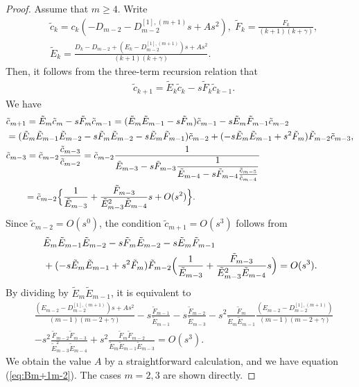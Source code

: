 \documentclass[10pt,a4paper]{amsart}
\begin{document}
\begin{proof}
Assume that $m \geq 4$.
Write
\begin{align}
& \tilde{c}_k = c_{k} (-D_{m-2} - D_{m-2}^{[1],(m+1)} s +A s^2 ) , \; \tilde{F}_k = \frac{F_k }{(k+1)(k+\gamma )} , \\
& \tilde{E}_k = \frac{D_k -D_{m-2} +  (E_k - D_{m-2}^{[1],(m+1)}) s +A s^2 }{(k+1)(k+\gamma )}  . \nonumber
\end{align}
Then, it follows from the three-term recursion relation that
\begin{align}
& \tilde{c}_{k+1} = \tilde{E}_{k} \tilde{c}_{k} - s \tilde{F}_{k} \tilde{c}_{k-1} .
\end{align}
We have
\begin{align}
& \tilde{c}_{m+1} = \tilde{E}_m \tilde{c}_{m} - s \tilde{F}_m \tilde{c}_{m-1} 
 = ( \tilde{E}_m \tilde{E}_{m-1} - s \tilde{F}_m  ) \tilde{c}_{m-1} - s \tilde{E}_m \tilde{F}_{m-1} \tilde{c}_{m-2} \\
& = ( \tilde{E}_m \tilde{E}_{m-1} \tilde{E}_{m-2} -s  \tilde{F}_m   \tilde{E}_{m-2} -s  \tilde{E}_m \tilde{F}_{m-1} ) \tilde{c}_{m-2} + ( - s \tilde{E}_m \tilde{E}_{m-1} + s^2  \tilde{F}_m  ) \tilde{F}_{m-2} \tilde{c}_{m-3} , \nonumber \\
& \tilde{c}_{m-3} = \tilde{c}_{m-2} \frac{\tilde{c}_{m-3}}{\tilde{c}_{m-2}}  = \tilde{c}_{m-2} \frac{1}{\displaystyle \tilde{E}_{m-3}  -s  \tilde{F}_{m-3} \frac{1}{\tilde{E}_{m-4} -s  \tilde{F}_{m-4} \frac{\tilde{c}_{m-5}}{\tilde{c}_{m-4}} } } \nonumber \\
& \qquad = \tilde{c}_{m-2} \Bigl\{ \frac{1}{\tilde{E}_{m-3}} + \frac{\tilde{F}_{m-3}}{\tilde{E}_{m-3}^2\tilde{E}_{m-4}} s +O(s^2)  \Bigr\} . \nonumber 
\end{align}
Since $ \tilde{c}_{m-2} = O(s^0)$, the condition $\tilde{c}_{m+1} = O(s^3)  $ follows from
\begin{align}
& \tilde{E}_m \tilde{E}_{m-1} \tilde{E}_{m-2} -s  \tilde{F}_m   \tilde{E}_{m-2} -s  \tilde{E}_m \tilde{F}_{m-1} \\
&  + ( - s \tilde{E}_m \tilde{E}_{m-1} + s^2  \tilde{F}_m  ) \tilde{F}_{m-2} \Bigl( \frac{1}{\tilde{E}_{m-3}} + \frac{\tilde{F}_{m-3}}{\tilde{E}_{m-3}^2\tilde{E}_{m-4}} s  \Bigr) = O(s^3) . \nonumber
\end{align}
By dividing by $\tilde{E}_m \tilde{E}_{m-1} $, it is equivalent to
\begin{align}
& \frac{(E_{m-2} - D_{m-2}^{[1],(m+1)}) s +A s^2}{(m-1)(m-2+\gamma )} -s \frac{\tilde{F}_{m-1}}{ \tilde{E}_{m-1}} - s \frac{\tilde{F}_{m-2} }{\tilde{E}_{m-3}}  -s^2  \frac{\tilde{F}_m  }{ \tilde{E}_m \tilde{E}_{m-1}}  \frac{ (E_{m-2} - D_{m-2}^{[1],(m+1)}) }{(m-1)(m-2+\gamma )} \\
& - s^2 \frac{\tilde{F}_{m-2} \tilde{F}_{m-3}}{\tilde{E}_{m-3}^2\tilde{E}_{m-4}} + s^2 \frac{\tilde{F}_m \tilde{F}_{m-2} }{ \tilde{E}_m \tilde{E}_{m-1} \tilde{E}_{m-3}} = O(s^3) . \nonumber 
\end{align}
We obtain the value $A$ by a straightforward calculation, and we have equation (\ref{eq:Bm+1m-2}).
The cases $m=2,3$ are shown directly.
\end{proof}
\end{document}
